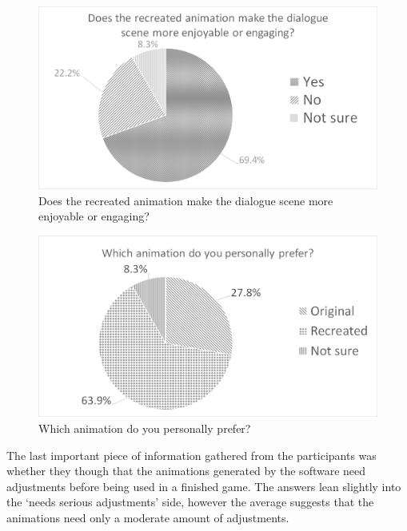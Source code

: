 \begin{figure}[!ht]
	\centerline{\includegraphics[width = 42em]{img/results/improves.png}}
	\caption{Does the recreated animation make the dialogue scene more enjoyable or engaging?}\label{fig:improves_graph}
\end{figure}

\begin{figure}[!ht]
\centerline{\includegraphics[width = 42em]{img/results/prefer.png}}
\caption{Which animation do you personally prefer?}\label{fig:prefer_graph}
\end{figure}


The last important piece of information gathered from the participants was whether they though that the animations generated by the software need adjustments before being used in a finished game. The answers lean slightly into the `needs serious adjustments' side, however the average suggests that the animations need only a moderate amount of adjustments.

